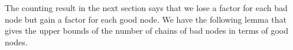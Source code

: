 \begin{defn}
\begin{enumerate}


 
 \end{enumerate}
\end{defn}

The counting result in the next section says that we lose a factor for each bad node but gain a factor for each good node. We have the following lemma that gives the upper bounds of the number of chains of bad nodes in terms of good nodes.

